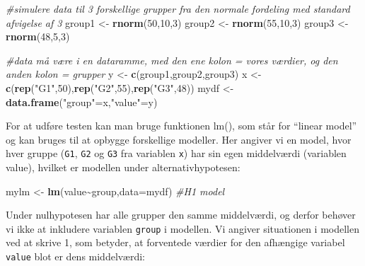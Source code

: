 \documentclass[
]{book}
\newenvironment{Shaded}{\begin{snugshade}}{\end{snugshade}}
\newcommand{\AttributeTok}[1]{\textcolor[rgb]{0.27,0.27,0.27}{#1}}
\newcommand{\CommentTok}[1]{\textcolor[rgb]{0.37,0.37,0.37}{\textit{#1}}}
\newcommand{\DecValTok}[1]{\textcolor[rgb]{0.06,0.06,0.06}{#1}}
\newcommand{\FunctionTok}[1]{\textcolor[rgb]{0.27,0.27,0.27}{\textbf{#1}}}
\newcommand{\NormalTok}[1]{#1}
\newcommand{\OtherTok}[1]{\textcolor[rgb]{0.37,0.37,0.37}{#1}}
\newcommand{\SpecialCharTok}[1]{\textcolor[rgb]{0.43,0.43,0.43}{\textbf{#1}}}
\newcommand{\StringTok}[1]{\textcolor[rgb]{0.5,0.5,0.5}{#1}}
\begin{document}
\begin{Shaded}
\begin{Highlighting}[]
\CommentTok{\#simulere data til 3 forskellige grupper fra den normale fordeling med standard afvigelse af 3}
\NormalTok{group1 }\OtherTok{\textless{}{-}} \FunctionTok{rnorm}\NormalTok{(}\DecValTok{50}\NormalTok{,}\DecValTok{10}\NormalTok{,}\DecValTok{3}\NormalTok{)}
\NormalTok{group2 }\OtherTok{\textless{}{-}} \FunctionTok{rnorm}\NormalTok{(}\DecValTok{55}\NormalTok{,}\DecValTok{10}\NormalTok{,}\DecValTok{3}\NormalTok{)}
\NormalTok{group3 }\OtherTok{\textless{}{-}} \FunctionTok{rnorm}\NormalTok{(}\DecValTok{48}\NormalTok{,}\DecValTok{5}\NormalTok{,}\DecValTok{3}\NormalTok{)}

\CommentTok{\#data må være i en dataramme, med den ene kolon = vores værdier, og den anden kolon = grupper}
\NormalTok{y }\OtherTok{\textless{}{-}} \FunctionTok{c}\NormalTok{(group1,group2,group3)}
\NormalTok{x }\OtherTok{\textless{}{-}} \FunctionTok{c}\NormalTok{(}\FunctionTok{rep}\NormalTok{(}\StringTok{"G1"}\NormalTok{,}\DecValTok{50}\NormalTok{),}\FunctionTok{rep}\NormalTok{(}\StringTok{"G2"}\NormalTok{,}\DecValTok{55}\NormalTok{),}\FunctionTok{rep}\NormalTok{(}\StringTok{"G3"}\NormalTok{,}\DecValTok{48}\NormalTok{))}
\NormalTok{mydf }\OtherTok{\textless{}{-}} \FunctionTok{data.frame}\NormalTok{(}\StringTok{"group"}\OtherTok{=}\NormalTok{x,}\StringTok{"value"}\OtherTok{=}\NormalTok{y)}
\end{Highlighting}
\end{Shaded}

For at udføre testen kan man bruge funktionen lm(), som står for ``linear model'' og kan bruges til at opbygge forskellige modeller. Her angiver vi en model, hvor hver gruppe (\texttt{G1}, \texttt{G2} og \texttt{G3} fra variablen \texttt{x}) har sin egen middelværdi (variablen value), hvilket er modellen under alternativhypotesen:

\begin{Shaded}
\begin{Highlighting}[]
\NormalTok{mylm }\OtherTok{\textless{}{-}} \FunctionTok{lm}\NormalTok{(value}\SpecialCharTok{\textasciitilde{}}\NormalTok{group,}\AttributeTok{data=}\NormalTok{mydf) }\CommentTok{\#H1 model}
\end{Highlighting}
\end{Shaded}

Under nulhypotesen har alle grupper den samme middelværdi, og derfor behøver vi ikke at inkludere variablen \texttt{group} i modellen. Vi angiver situationen i modellen ved at skrive 1, som betyder, at forventede værdier for den afhængige variabel \texttt{value} blot er dens middelværdi:
\end{document}
